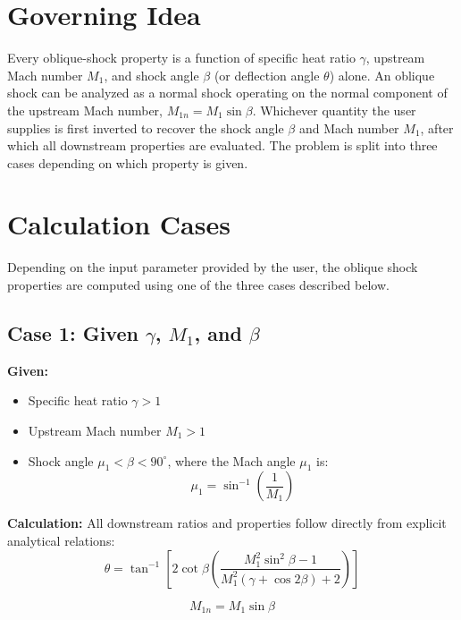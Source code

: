 \section{Governing Idea}

Every oblique-shock property is a function of specific heat ratio $\gamma$, upstream Mach number $M_1$, and shock angle $\beta$ (or deflection angle $\theta$) alone. An oblique shock can be analyzed as a normal shock operating on the normal component of the upstream Mach number, $M_{1n} = M_1\sin\beta$. Whichever quantity the user supplies is first inverted to recover the shock angle $\beta$ and Mach number $M_1$, after which all downstream properties are evaluated. The problem is split into three cases depending on which property is given.

\section{Calculation Cases}

Depending on the input parameter provided by the user, the oblique shock properties are computed using one of the three cases described below.

\subsection*{Case 1: Given $\gamma$, $M_1$, and $\beta$}

\textbf{Given:}
\begin{itemize}[nosep]
    \item Specific heat ratio $\gamma > 1$
    \item Upstream Mach number $M_1 > 1$
    \item Shock angle $\mu_1 < \beta < 90^\circ$, where the Mach angle $\mu_1$ is:
    \begin{equation}
    \mu_1 = \sin^{-1}\left(\frac{1}{M_1}\right)
    \end{equation}
\end{itemize}

\textbf{Calculation:} All downstream ratios and properties follow directly from explicit analytical relations:
\begin{equation}
\theta = \tan^{-1}\left[2\cot\beta\left(\frac{M_1^2\sin^2\beta - 1}{M_1^2(\gamma+\cos2\beta)+2}\right)\right]
\end{equation}

\begin{equation}
M_{1n} = M_1\sin\beta
\end{equation}

